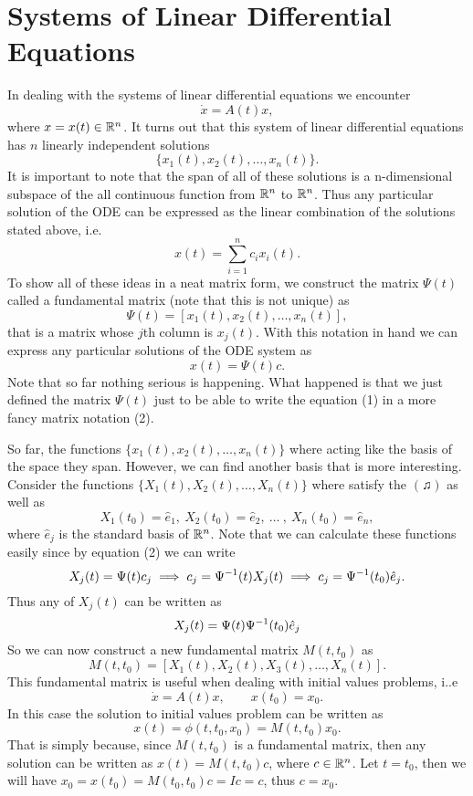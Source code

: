 \section{Systems of Linear Differential Equations}

In dealing with the systems of linear differential equations we encounter
\[ \dot{x} = A(t) x, \tag{\twonotes} \]
where $x = x(t) \in \mathbb{R}^n $. It turns out that this system of linear differential equations has $n$ linearly independent solutions
\[ \{x_1(t), x_2(t), \hdots, x_n(t)\}. \]
It is important to note that the span of all of these solutions is a n-dimensional subspace of the all continuous function from $\mathbb{R}^n$ to $\mathbb{R}^n$. Thus any particular solution of the ODE can be expressed as the linear combination of the solutions stated above, i.e.
\[ x(t) = \sum_{i=1}^{n} c_i x_i(t). \tag{1} \]
To show all of these ideas in a neat matrix form, we construct the matrix $\Psi(t)$ called a fundamental matrix (note that this is not unique) as
\[ \Psi(t) = [ x_1(t), x_2(t), \hdots, x_n(t) ], \]
that is a matrix whose $j$th column is $x_j(t)$. With this notation in hand we can express any particular solutions of the ODE system as
\[ x(t) = \Psi(t) c. \tag{2} \]
Note that so far nothing serious is happening. What happened is that we just defined the matrix $\Psi(t)$ just to be able to write the equation (1) in a more fancy matrix notation (2).

So far, the functions $\{x_1(t), x_2(t), \hdots, x_n(t)\}$ where acting like the basis of the space they span. However, we can find another basis that is more interesting. Consider the functions $\{ X_1(t), X_2(t), \hdots, X_n(t) \}$ where satisfy the $(\twonotes)$ as well as 
\[ X_1(t_0) = \hat{e}_1,\ X_2(t_0) = \hat{e}_2,\ \hdots\ ,\ X_n(t_0) = \hat{e}_n, \]
where $\hat{e}_j$ is the standard basis of $\mathbb{R}^n$. Note that we can calculate these functions easily since by equation (2) we can write
\[ X_j(t) = \Psi(t) c_j \implies c_j = \Psi^{-1}(t) X_j(t) \implies c_j = \Psi^{-1}(t_0) \hat{e}_j. \]
Thus any of $X_j(t)$ can be written as
\[ X_j(t) = \Psi(t) \Psi^{-1}(t_0)\hat{e}_j \]
So we can now construct a new fundamental matrix $M(t,t_0)$ as 
\[ M(t,t_0) = [ X_1(t), X_2(t), X_3(t), \hdots, X_n(t) ]. \]
This fundamental matrix is useful when dealing with initial values problems, i..e
\[ \dot{x} = A(t) x,\qquad x(t_0) = x_0. \tag{\eighthnote}\] 
In this case the solution to initial values problem can be written as
\[ x(t) = \phi(t,t_0,x_0) = M(t,t_0) x_0. \]
That is simply because, since $M(t,t_0)$ is a fundamental matrix, then any solution can be written as $x(t)=M(t,t_0)c$, where $c\in\mathbb{R}^n$. Let $t=t_0$, then we will have $x_0 = x(t_0) = M(t_0,t_0) c  = I c = c$, thus $c = x_0$.


